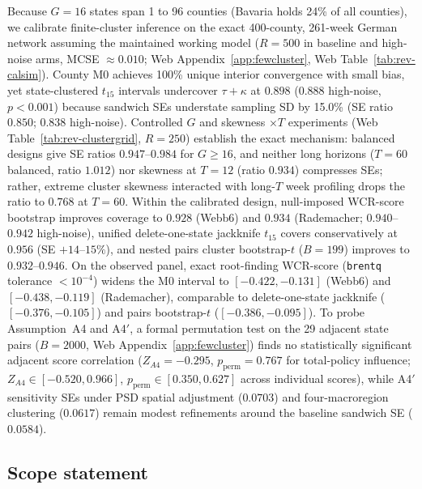 Because $G=16$ states span 1 to 96 counties (Bavaria holds 24\% of all counties), we calibrate
finite-cluster inference on the exact 400-county, 261-week German network assuming the maintained
working model ($R=500$ in baseline and high-noise arms, MCSE $\approx 0.010$; Web
Appendix~\ref{app:fewcluster}, Web Table~\ref{tab:rev-calsim}). County M0 achieves 100\% unique
interior convergence with small bias, yet state-clustered $t_{15}$ intervals undercover $\tau+\kappa$
at $0.898$ ($0.888$ high-noise, $p<0.001$) because sandwich SEs understate sampling SD by 15.0\%
(SE ratio $0.850$; $0.838$ high-noise). Controlled $G$ and skewness $\times T$ experiments (Web
Table~\ref{tab:rev-clustergrid}, $R=250$) establish the exact mechanism: balanced designs give SE
ratios $0.947$--$0.984$ for $G\ge 16$, and neither long horizons ($T=60$ balanced, ratio $1.012$)
nor skewness at $T=12$ (ratio $0.934$) compresses SEs; rather, extreme cluster skewness interacted
with long-$T$ week profiling drops the ratio to $0.768$ at $T=60$. Within the calibrated design,
null-imposed WCR-score bootstrap improves coverage to $0.928$ (Webb6) and $0.934$ (Rademacher;
$0.940$--$0.942$ high-noise), unified delete-one-state jackknife $t_{15}$ covers conservatively at
$0.956$ (SE $+14$--$15\%$), and nested pairs cluster bootstrap-$t$ ($B=199$) improves to
$0.932$--$0.946$. On the observed panel, exact root-finding WCR-score (\texttt{brentq} tolerance $<10^{-4}$)
widens the M0 interval to $[-0.422,-0.131]$ (Webb6) and $[-0.438,-0.119]$ (Rademacher),
comparable to delete-one-state jackknife ($[-0.376,-0.105]$) and pairs bootstrap-$t$
($[-0.386,-0.095]$). To probe Assumption~A4 and A4$'$, a formal permutation test on the 29
adjacent state pairs ($B=2000$, Web Appendix~\ref{app:fewcluster}) finds no statistically
significant adjacent score correlation ($Z_{A4}=-0.295$, $p_{\mathrm{perm}}=0.767$ for total-policy
influence; $Z_{A4}\in[-0.520,0.966]$, $p_{\mathrm{perm}}\in[0.350,0.627]$ across individual scores),
while A4$'$ sensitivity SEs under PSD spatial adjustment ($0.0703$) and four-macroregion clustering
($0.0617$) remain modest refinements around the baseline sandwich SE ($0.0584$).

\subsection{Scope statement}
\label{ss:app-scope}


